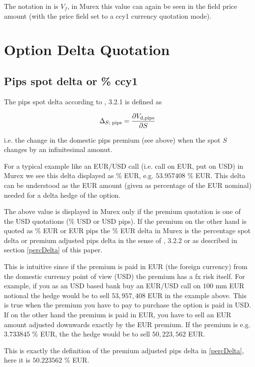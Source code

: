 \documentclass{amsart}
\theoremstyle{plain}
\numberwithin{equation}{section}
\begin{document}
The notation in \cite{Clark} is $V_f$, in Murex this value can again be seen in the field price amount (with the
price field set to a ccy1 currency quotation mode).

\section{Option Delta Quotation}

\subsection{Pips spot delta or \% ccy1}
\label{pipsDelta}

The pips spot delta according to \cite{Clark}, 3.2.1 is defined as

\begin{equation}
\Delta_{S\textnormal{; pips}} = \frac{\partial V_{\textnormal{d,pips}}}{\partial S}
\end{equation}

i.e. the change in the domestic pips premium (see above) when the spot $S$ changes by an infinitesimal amonut.

For a typical example like an EUR/USD call (i.e. call on EUR, put on USD) in Murex we see this delta displayed
as \% EUR, e.g. $53.957408$ \% EUR. This delta can be understood as the EUR amount (given as percentage of the
EUR nominal) needed for a delta hedge of the option.

The above value is displayed in Murex only if the premium quotation is one of the USD quotations (\% USD or
USD pips). If the premium on the other hand is quoted as \% EUR or EUR pips the \% EUR delta in Murex is
the percentage spot delta or premium adjusted pips delta in the sense of \cite{Clark}, 3.2.2 or as described
in section \ref{percDelta} of this paper.

This is intuitive since if the premium is paid in EUR (the foreign currency) from the domestic currency
point of view (USD) the premium has a fx risk itself. For example, if you as an USD based bank buy an
EUR/USD call on $100$ mm EUR notional the hedge would be to sell $53,957,408$ EUR in the example above.
This is true when the premium you have to pay to purchase the option is paid in USD. If on the other
hand the premium is paid in EUR, you have to sell an EUR amount adjusted downwards exactly by the EUR premium.
If the premium is e.g. $3.733845$ \% EUR, the the hedge would be to sell $50,223,562$ EUR.

This is exactly the definition of the premium adjusted pips delta in \ref{percDelta}, here it is 
$50.223562$ \% EUR.
\end{document}
